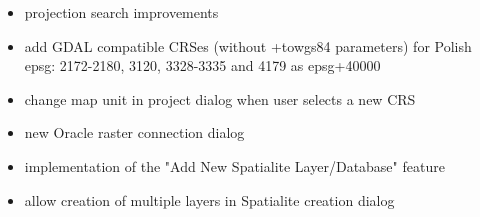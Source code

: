 \begin{itemize}[label=--]
 \item projection search improvements
 \item add GDAL compatible CRSes (without +towgs84 parameters) for Polish epsg: 2172-2180, 3120, 3328-3335 and 4179 as epsg+40000
 \item change map unit in project dialog when user selects a new CRS
 \item new Oracle raster connection dialog 
 \item implementation of the "Add New Spatialite Layer/Database" feature
 \item allow creation of multiple layers in Spatialite creation dialog

\end{itemize}
